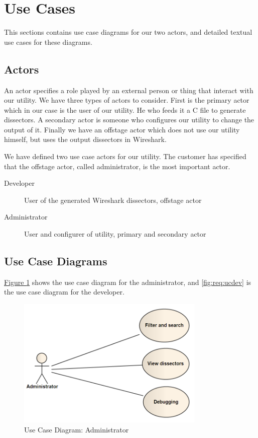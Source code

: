 \section{Use Cases}
\label{sec:req:usecases}
This sections contains use case diagrams for our two actors, and detailed
textual use cases for these diagrams.

\subsection{Actors}
An actor specifies a role played by an external person or thing that interact
with our utility. We have three types of actors to consider. First is the
primary actor which in our case is the user of our utility. He who feeds it a
C file to generate dissectors. A secondary actor is someone who configures our
utility to change the output of it. Finally we have an offstage actor which
does not use our utility himself, but uses the output dissectors in Wireshark.

We have defined two use case actors for our utility. The customer has specified
that the offstage actor, called administrator, is the most important actor.
\begin{description}
	\item[Developer] User of the generated Wireshark dissectors, offstage actor
	\item[Administrator] User and configurer of utility, primary and secondary actor
\end{description}

\subsection{Use Case Diagrams}
\hyperref[fig:req:ucadm]{Figure \ref*{fig:req:ucadm}} shows the use case
diagram for the administrator, and \autoref{fig:req:ucdev} is the use case
diagram for the developer.
\begin{figure}[htbp]
	\center
	\includegraphics[width=0.8\textwidth]{./planning/img/administrator}
	\caption{Use Case Diagram: Administrator\label{fig:req:ucadm}}
\end{figure}

